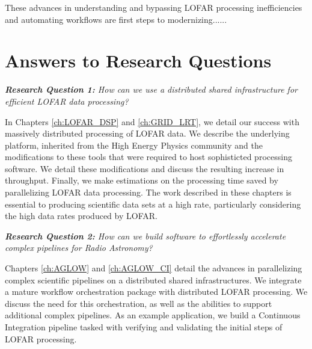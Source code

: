 These advances in understanding and bypassing LOFAR processing inefficiencies and automating workflows are first steps to modernizing......  



\section{Answers to Research Questions}


\begin{addmargin}[4em]{8em}%
    \emph{\textbf{Research Question 1:} How can we use a distributed shared infrastructure for efficient LOFAR data processing?}
\end{addmargin}

In Chapters \ref{ch:LOFAR_DSP} and \ref{ch:GRID_LRT}, we detail our success with massively distributed processing of LOFAR data. We describe the underlying platform, inherited from the High Energy Physics community and the modifications to these tools that were required to host sophisticted processing software. We detail these modifications and discuss the resulting increase in throughput. Finally, we make estimations on the processing time saved by parallelizing LOFAR data processing. The work described in these chapters is essential to producing scientific data sets at a high rate, particularly considering the high data rates produced by LOFAR.  


\begin{addmargin}[4em]{8em}%
    \emph{\textbf{Research Question 2:}  How can we build software to effortlessly accelerate complex pipelines for Radio Astronomy?} 
\end{addmargin}

Chapters \ref{ch:AGLOW} and \ref{ch:AGLOW_CI} detail the advances in parallelizing complex scientific pipelines on a distributed shared infrastructures. We integrate a mature workflow orchestration package with distributed LOFAR processing. We discuss the need for this orchestration, as well as the abilities to support additional complex pipelines. As an example application, we build a Continuous Integration pipeline tasked with verifying and validating the initial steps of LOFAR processing. 


